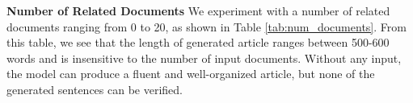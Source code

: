 \documentclass[11pt]{article}
\begin{document}
\begin{table}[t]

\caption{Impact of the number of related documents.}
\label{tab:num_documents}
\end{table}

\noindent \textbf{Number of Related Documents}\quad
We experiment with a number of related documents ranging from 0 to 20, as shown in Table \ref{tab:num_documents}. From this table, we see that the length of generated article ranges between 500-600 words and is insensitive to the number of input documents. Without any input, the model can produce a fluent and well-organized article, but none of the generated sentences can be verified.
\end{document}

